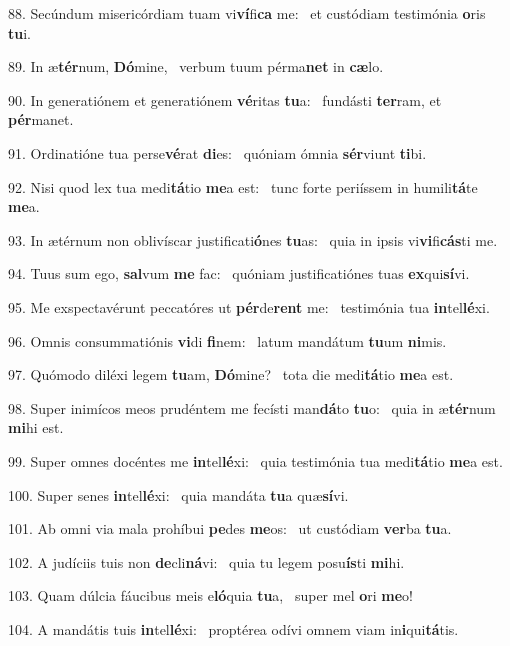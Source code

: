 88. Secúndum misericórdiam tuam vi\textbf{ví}fi\textbf{ca} me: \ast\  et custódiam testimónia \textbf{o}ris \textbf{tu}i.\

89. In æ\textbf{tér}num, \textbf{Dó}mine, \ast\  verbum tuum pérma\textbf{net} in \textbf{cæ}lo.\

90. In generatiónem et generatiónem \textbf{vé}ritas \textbf{tu}a: \ast\  fundásti \textbf{ter}ram, et \textbf{pér}manet.\

91. Ordinatióne tua perse\textbf{vé}rat \textbf{di}es: \ast\  quóniam ómnia \textbf{sér}viunt \textbf{ti}bi.\

92. Nisi quod lex tua medi\textbf{tá}tio \textbf{me}a est: \ast\  tunc forte periíssem in humili\textbf{tá}te \textbf{me}a.\

93. In ætérnum non oblivíscar justificati\textbf{ó}nes \textbf{tu}as: \ast\  quia in ipsis vi\textbf{vi}fi\textbf{cás}ti me.\

94. Tuus sum ego, \textbf{sal}vum \textbf{me} fac: \ast\  quóniam justificatiónes tuas \textbf{ex}qui\textbf{sí}vi.\

95. Me exspectavérunt peccatóres ut \textbf{pér}de\textbf{rent} me: \ast\  testimónia tua \textbf{in}tel\textbf{lé}xi.\

96. Omnis consummatiónis \textbf{vi}di \textbf{fi}nem: \ast\  latum mandátum \textbf{tu}um \textbf{ni}mis.\

97. Quómodo diléxi legem \textbf{tu}am, \textbf{Dó}mine? \ast\  tota die medi\textbf{tá}tio \textbf{me}a est.\

98. Super inimícos meos prudéntem me fecísti man\textbf{dá}to \textbf{tu}o: \ast\  quia in æ\textbf{tér}num \textbf{mi}hi est.\

99. Super omnes docéntes me \textbf{in}tel\textbf{lé}xi: \ast\  quia testimónia tua medi\textbf{tá}tio \textbf{me}a est.\

100. Super senes \textbf{in}tel\textbf{lé}xi: \ast\  quia mandáta \textbf{tu}a quæ\textbf{sí}vi.\

101. Ab omni via mala prohíbui \textbf{pe}des \textbf{me}os: \ast\  ut custódiam \textbf{ver}ba \textbf{tu}a.\

102. A judíciis tuis non \textbf{de}cli\textbf{ná}vi: \ast\  quia tu legem posu\textbf{ís}ti \textbf{mi}hi.\

103. Quam dúlcia fáucibus meis e\textbf{ló}quia \textbf{tu}a, \ast\  super mel \textbf{o}ri \textbf{me}o!\

104. A mandátis tuis \textbf{in}tel\textbf{lé}xi: \ast\  proptérea odívi omnem viam in\textbf{i}qui\textbf{tá}tis.\


